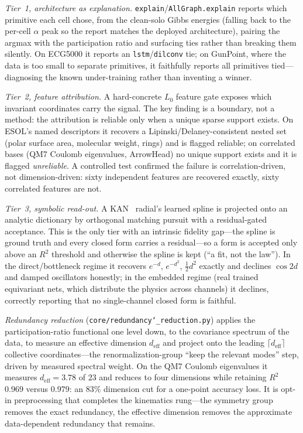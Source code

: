 \documentclass[11pt]{article}
\newcommand{\allowbreakhere}{\discretionary{}{}{}}
\newcommand{\code}[1]{\texttt{\def\_{\char`_\allowbreakhere}#1}}
\begin{document}
\emph{Tier~1, architecture as explanation.} \code{explain}/\code{AllGraph.explain} reports which primitive
each cell chose, from the clean-solo Gibbs energies (falling back to the per-cell $\alpha$ peak so the report
matches the deployed architecture), pairing the argmax with the participation ratio and surfacing ties rather
than breaking them silently. On ECG5000 it reports an \code{lstm}/\code{dilconv} tie; on GunPoint, where the
data is too small to separate primitives, it faithfully reports all primitives tied---diagnosing the known
under-training rather than inventing a winner.

\emph{Tier~2, feature attribution.} A hard-concrete $L_0$ feature gate exposes which invariant coordinates
carry the signal. The key finding is a boundary, not a method: the attribution is reliable only when a unique
sparse support exists. On ESOL's named descriptors it recovers a Lipinski/Delaney-consistent nested set
(polar surface area, molecular weight, rings) and is flagged reliable; on correlated bases (QM7 Coulomb
eigenvalues, ArrowHead) no unique support exists and it is flagged \emph{unreliable}. A controlled test
confirmed the failure is correlation-driven, not dimension-driven: sixty independent features are recovered
exactly, sixty correlated features are not.

\emph{Tier~3, symbolic read-out.} A KAN~\cite{liu2024kan,hu2025equivkan} radial's learned spline is projected onto an analytic dictionary by
orthogonal matching pursuit with a residual-gated acceptance. This is the only tier with an intrinsic fidelity
gap---the spline is ground truth and every closed form carries a residual---so a form is accepted only above an
$R^2$ threshold and otherwise the spline is kept (``a fit, not the law''). In the direct/bottleneck regime it
recovers $e^{-d}$, $e^{-d^2}$, $\tfrac12 d^2$ exactly and declines $\cos 2d$ and damped oscillators honestly;
in the embedded regime (real trained equivariant nets, which distribute the physics across channels) it
declines, correctly reporting that no single-channel closed form is faithful.

\emph{Redundancy reduction} (\code{core/redundancy\_reduction.py}) applies the participation-ratio functional
one level down, to the covariance spectrum of the data, to measure an effective dimension
$d_{\mathrm{eff}}$ and project onto the leading $\lceil d_{\mathrm{eff}}\rceil$ collective coordinates---the
renormalization-group ``keep the relevant modes'' step, driven by measured spectral weight. On the QM7 Coulomb
eigenvalues it measures $d_{\mathrm{eff}}=3.78$ of $23$ and reduces to four dimensions while retaining $R^2$
$0.969$ versus $0.979$: an $83\%$ dimension cut for a one-point accuracy loss. It is opt-in preprocessing that
completes the kinematics rung---the symmetry group removes the exact redundancy, the effective dimension
removes the approximate data-dependent redundancy that remains.
\end{document}
